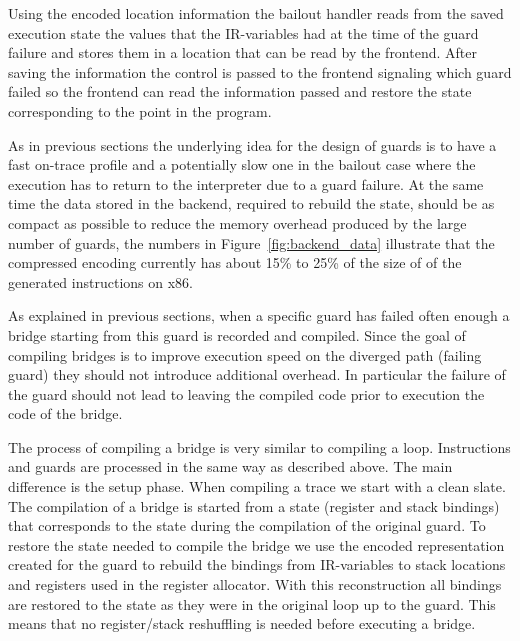 \documentclass[10pt,preprint]{sigplanconf}
\begin{document}
Using the encoded location information the bailout handler reads from the
saved execution state the values that the IR-variables had  at the time of the
guard failure and stores them in a location that can be read by the frontend.
After saving the information the control is passed to the frontend signaling
which guard failed so the frontend can read the information passed and restore
the state corresponding to the point in the program.

As in previous sections the underlying idea for the design of guards is to have
a fast on-trace profile and a potentially slow one in the bailout case where
the execution has to return to the interpreter due to a guard failure. At the same
time the data stored in the backend, required to rebuild the state, should be as
compact as possible to reduce the memory overhead produced by the large number
of guards, the numbers in Figure~\ref{fig:backend_data} illustrate that the
compressed encoding currently has about 15\% to 25\% of the size of of the
generated instructions on x86.

As explained in previous sections, when a specific guard has failed often enough
a bridge starting from this guard is recorded and compiled.
Since the goal of compiling bridges is to improve execution speed on the
diverged path (failing guard) they should not introduce additional overhead.
In particular the failure of the guard should not lead
to leaving the compiled code prior to execution the code of the bridge.

The process of compiling a bridge is very similar to compiling a loop.
Instructions and guards are processed in the same way as described above. The
main difference is the setup phase. When compiling a trace we start with a clean
slate. The compilation of a bridge is started from a state (register and stack
bindings) that corresponds to the state during the compilation of the original
guard. To restore the state needed to compile the bridge we use the encoded
representation created for the guard to rebuild the bindings from IR-variables
to stack locations and registers used in the register allocator.  With this
reconstruction all bindings are restored to the state as they were in the
original loop up to the guard. This means that no register/stack reshuffling is
needed before executing a bridge.
\end{document}
